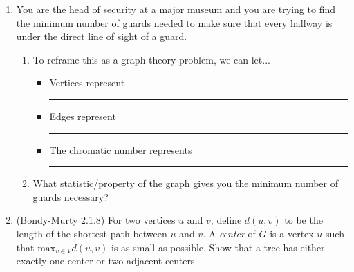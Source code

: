 \documentclass[12pt]{article}
\begin{document}
\begin{enumerate}
       \item You are the head of security at a major museum and you are trying to find the minimum number of guards needed to make sure that every hallway is under the direct line of sight of a guard.  
\begin{enumerate}
\item  To reframe this as a graph theory problem, we can let...
\begin{itemize}
\item Vertices represent \rule{1cm}{0.15mm}
\item Edges represent \rule{1cm}{0.15mm}
\item The chromatic number represents \rule{1cm}{0.15mm}
\end{itemize}
\item What statistic/property of the graph gives you the minimum number of guards necessary?
\end{enumerate}       
     \item (Bondy-Murty 2.1.8) For two vertices $u$ and $v$, define $d(u,v)$ to be the length of the shortest path between $u$ and $v$. A \emph{center} of $G$ is a vertex $u$ such that $\mathrm{max}_{v\in V} d(u,v)$ is as small as possible. Show that a tree has either exactly one center or two adjacent centers. 
 
\end{enumerate}
\end{document}
